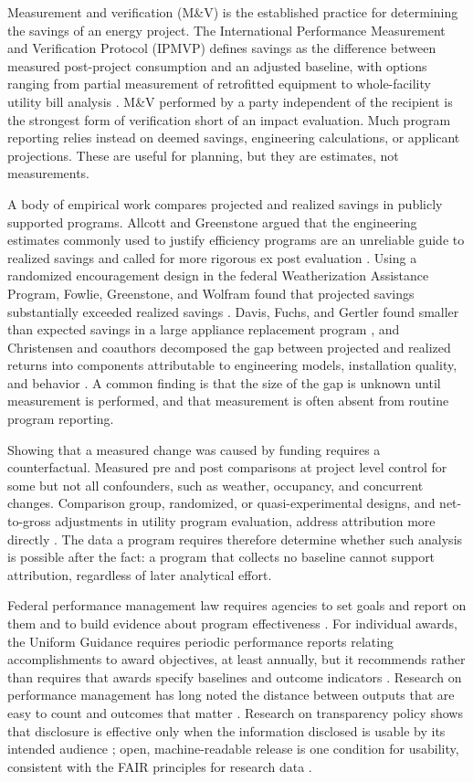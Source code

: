 \documentclass[10pt,twocolumn,letterpaper]{article}
\begin{document}
Measurement and verification (M\&V) is the established practice for determining the savings of an energy project. The International Performance Measurement and Verification Protocol (IPMVP) defines savings as the difference between measured post-project consumption and an adjusted baseline, with options ranging from partial measurement of retrofitted equipment to whole-facility utility bill analysis \cite{evo2022}. M\&V performed by a party independent of the recipient is the strongest form of verification short of an impact evaluation. Much program reporting relies instead on deemed savings, engineering calculations, or applicant projections. These are useful for planning, but they are estimates, not measurements.

A body of empirical work compares projected and realized savings in publicly supported programs. Allcott and Greenstone argued that the engineering estimates commonly used to justify efficiency programs are an unreliable guide to realized savings and called for more rigorous ex post evaluation \cite{allcott2012}. Using a randomized encouragement design in the federal Weatherization Assistance Program, Fowlie, Greenstone, and Wolfram found that projected savings substantially exceeded realized savings \cite{fowlie2018}. Davis, Fuchs, and Gertler found smaller than expected savings in a large appliance replacement program \cite{davis2014}, and Christensen and coauthors decomposed the gap between projected and realized returns into components attributable to engineering models, installation quality, and behavior \cite{christensen2023}. A common finding is that the size of the gap is unknown until measurement is performed, and that measurement is often absent from routine program reporting.

Showing that a measured change was caused by funding requires a counterfactual. Measured pre and post comparisons at project level control for some but not all confounders, such as weather, occupancy, and concurrent changes. Comparison group, randomized, or quasi-experimental designs, and net-to-gross adjustments in utility program evaluation, address attribution more directly \cite{gertler2016}. The data a program requires therefore determine whether such analysis is possible after the fact: a program that collects no baseline cannot support attribution, regardless of later analytical effort.

Federal performance management law requires agencies to set goals and report on them \cite{gpra2010} and to build evidence about program effectiveness \cite{evidenceact2018}. For individual awards, the Uniform Guidance requires periodic performance reports relating accomplishments to award objectives, at least annually, but it recommends rather than requires that awards specify baselines and outcome indicators \cite{cfr200}. Research on performance management has long noted the distance between outputs that are easy to count and outcomes that matter \cite{heinrich2002,moynihan2008}. Research on transparency policy shows that disclosure is effective only when the information disclosed is usable by its intended audience \cite{fung2007,hood2006}; open, machine-readable release is one condition for usability, consistent with the FAIR principles for research data \cite{wilkinson2016}.
\end{document}
